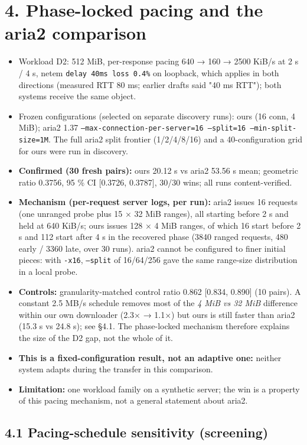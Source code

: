\documentclass[conference]{IEEEtran}
\begin{document}
\section*{4. Phase-locked pacing and the aria2 comparison}

\begin{itemize}
\item Workload D2: 512 MiB, per-response pacing 640 → 160 → 2500 KiB/s at 2 s / 4 s, netem \texttt{delay 40ms loss 0.4\%} on loopback, which applies in both directions (measured RTT 80 ms; earlier drafts said "40 ms RTT"); both systems receive the same object.
\item Frozen configurations (selected on separate discovery runs): ours (16 conn, 4 MiB); aria2 1.37 \texttt{--max-connection-per-server=16 --split=16 --min-split-size=1M}. The full aria2 split frontier (1/2/4/8/16) and a 40-configuration grid for ours were run in discovery.
\item \textbf{Confirmed (30 fresh pairs):} ours 20.12 s vs aria2 53.56 s mean; geometric ratio 0.3756, 95 \% CI [0.3726, 0.3787], 30/30 wins; all runs content-verified.
\item \textbf{Mechanism (per-request server logs, per run):} aria2 issues 16 requests (one unranged probe plus 15 × 32 MiB ranges), all starting before 2 s and held at 640 KiB/s; ours issues 128 × 4 MiB ranges, of which 16 start before 2 s and 112 start after 4 s in the recovered phase (3840 ranged requests, 480 early / 3360 late, over 30 runs). aria2 cannot be configured to finer initial pieces: with \texttt{-x16}, \texttt{--split} of 16/64/256 gave the same range-size distribution in a local probe.
\item \textbf{Controls:} granularity-matched control ratio 0.862 [0.834, 0.890] (10 pairs). A constant 2.5 MB/s schedule removes most of the \emph{4 MiB vs 32 MiB} difference within our own downloader (2.3× → 1.1×) but ours is still faster than aria2 (15.3 s vs 24.8 s); see §4.1. The phase-locked mechanism therefore explains the size of the D2 gap, not the whole of it.
\item \textbf{This is a fixed-configuration result, not an adaptive one:} neither system adapts during the transfer in this comparison.
\item \textbf{Limitation:} one workload family on a synthetic server; the win is a property of this pacing mechanism, not a general statement about aria2.
\end{itemize}

\subsection*{4.1 Pacing-schedule sensitivity (screening)}
\end{document}
